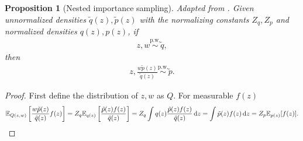 \documentclass{article}
\newtheorem{proposition}{Proposition}
\theoremstyle{definition}
\newcommand{\pw}{\overset{\text{p.w.}}{\sim}
}
\begin{document}
\begin{proposition}[Nested importance sampling]
    Adapted from \cite[Algorithm 1]{naesseth2015nested}.
    Given unnormalized densities $\tilde q(z), \tilde p(z)$ with the normalizing constants $Z_q, Z_p$ and normalized densities $q(z), p(z)$, if 
    \begin{align}
        z, w \pw \tilde q, \label{eq:1}
    \end{align}
    then
    \begin{align*}
        z, \frac{w\tilde p(z)}{\tilde q(z)} \pw \tilde p.
    \end{align*}
\end{proposition}
\begin{proof}
    First define the distribution of $z, w$ as $Q$.
    For measurable $f(z)$
    \begin{align*}
        \mathbb{E}_{Q(z, w)}\left[\frac{w\tilde p(z)}{\tilde q(z)} f(z)\right] 
        = Z_q \mathbb{E}_{q(z)}\left[\frac{\tilde p(z) f(z)}{\tilde q(z)}\right]
        = Z_q \int q(z) \frac{\tilde p(z) f(z)}{\tilde q(z)} \,\mathrm dz
        = \int \tilde p\textbf{}(z) f(z) \,\mathrm dz
        = Z_p \mathbb{E}_{p(z)}[f(z)].
    \end{align*}
\end{proof}
\end{document}
